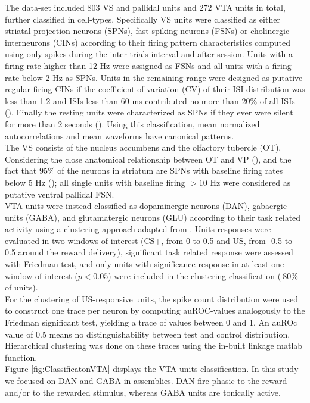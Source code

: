 \begin{framed}
The data-set included $803$ VS and pallidal units and $272$ VTA units in total, further classified in cell-types. Specifically VS units were classified as either striatal projection neurons (SPNs), fast-spiking neurons (FSNs) or cholinergic interneurons (CINs) according to their firing pattern characteristics computed using only spikes during the inter-trials interval and after session. Units with a firing rate higher than 12 Hz were assigned as FSNs and all units with a firing rate below 2 Hz as SPNs. Units in the remaining range were designed as putative regular-firing CINs if the coefficient of variation (CV) of their ISI distribution was less than 1.2 and ISIs less than 60 ms contributed no more than 20$\%$ of all ISIs (\cite{Inokawa}). Finally the resting units were characterized as SPNs if they ever were silent for more than 2 seconds (\cite{Graybiel}). Using this classification, mean normalized autocorrelations and mean waveforms have canonical patterns.\\The VS consists of the nucleus accumbens and the olfactory tubercle (OT). Considering the close anatomical relationship between OT and VP (\cite{Heimer1982}), and  the fact that 95$\%$ of the neurons in striatum are SPNs with baseline firing rates below 5 Hz (\cite{Kravitz}); all single units with baseline firing $> 10$ Hz were considered as putative ventral pallidal FSN.\\VTA units were instead classified as dopaminergic neurons (DAN), gabaergic units (GABA), and glutamatergic neurons (GLU) according to their task related activity using a clustering approach adapted from \cite{Uchida}. Units responses were evaluated in two windows of interest (CS+, from 0 to 0.5 and US, from -0.5 to 0.5 around the reward delivery), significant task related response were assessed with Friedman test, and only units with significance response in at least one window of interest ($p<0.05$) were included in the clustering classification ($~80\%$ of units).\\For the clustering of US-responsive units, the spike count distribution were used to construct one trace per neuron by computing auROC-values analogously to the Friedman significant test, yielding a trace of values between 0 and 1. An auROc value of 0.5 means no distinguishability between test and control distribution. Hierarchical clustering was done on these traces using the in-built linkage matlab function.\\Figure \ref{fig:ClassificatonVTA} displays the VTA units classification. In this study we focused on DAN and GABA in assemblies. DAN fire phasic to the reward and/or to the rewarded stimulus, whereas GABA units are tonically active.

\end{framed}
